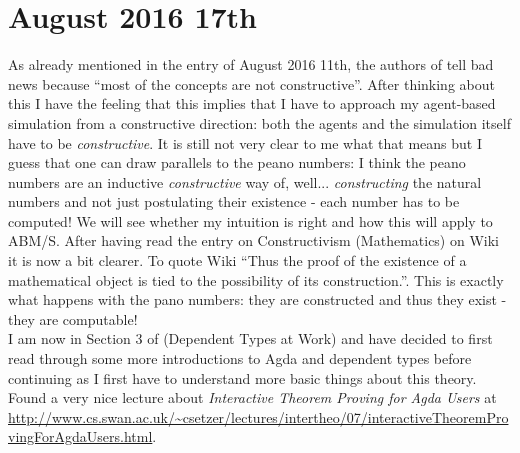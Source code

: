 \section*{August 2016 17th}
As already mentioned in the entry of August 2016 11th, the authors of \cite{Ionescu2013} tell bad news because \enquote{most of the concepts are not constructive}. After thinking about this I have the feeling that this implies that I have to approach my agent-based simulation from a constructive direction: both the agents and the simulation itself have to be \textit{constructive}. It is still not very clear to me what that means but I guess that one can draw parallels to the peano numbers: I think the peano numbers are an inductive \textit{constructive} way of, well... \textit{constructing} the natural numbers and not just postulating their existence - each number has to be computed! We will see whether my intuition is right and how this will apply to ABM/S. 
\bigskip
After having read the entry on Constructivism (Mathematics) on Wiki it is now a bit clearer. To quote Wiki \enquote{Thus the proof of the existence of a mathematical object is tied to the possibility of its construction.}. This is exactly what happens with the pano numbers: they are constructed and thus they exist - they are computable! \\
\bigskip
I am now in Section 3 of \cite{Bove2009} (Dependent Types at Work) and have decided to first read through some more introductions to Agda and dependent types before continuing as I first have to understand more basic things about this theory. \\
\bigskip
Found a very nice lecture about \textit{Interactive Theorem Proving for Agda Users} at \url{http://www.cs.swan.ac.uk/~csetzer/lectures/intertheo/07/interactiveTheoremProvingForAgdaUsers.html}. 